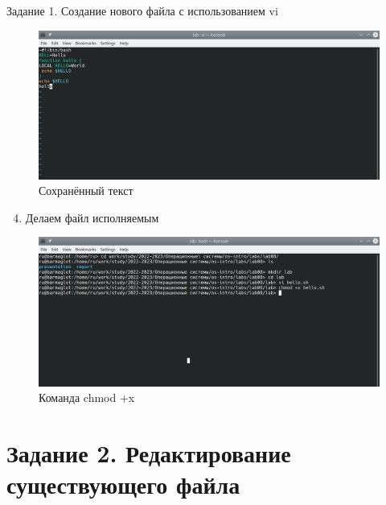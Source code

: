 \begin{frame}{Задание 1. Создание нового файла с использованием vi}
\begin{figure}
\hypertarget{fig:003}{%
\centering
\includegraphics[width=1\textwidth,height=\textheight]{image/4.png}
\caption{Сохранённый текст}\label{fig:003}
}
\end{figure}

\begin{enumerate}
\setcounter{enumi}{3}
\tightlist
\item
  Делаем файл исполняемым
\end{enumerate}

\begin{figure}
\hypertarget{fig:004}{%
\centering
\includegraphics[width=1\textwidth,height=\textheight]{image/3.png}
\caption{Команда chmod +x}\label{fig:004}
}
\end{figure}
\end{frame}

\hypertarget{ux437ux430ux434ux430ux43dux438ux435-2.-ux440ux435ux434ux430ux43aux442ux438ux440ux43eux432ux430ux43dux438ux435-ux441ux443ux449ux435ux441ux442ux432ux443ux44eux449ux435ux433ux43e-ux444ux430ux439ux43bux430}{%
\section{Задание 2. Редактирование существующего
файла}\label{ux437ux430ux434ux430ux43dux438ux435-2.-ux440ux435ux434ux430ux43aux442ux438ux440ux43eux432ux430ux43dux438ux435-ux441ux443ux449ux435ux441ux442ux432ux443ux44eux449ux435ux433ux43e-ux444ux430ux439ux43bux430}}

